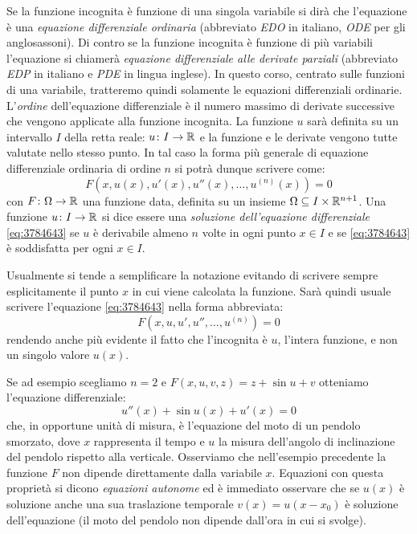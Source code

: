 Se la funzione incognita è funzione di una singola variabile si dirà che l'equazione è una
\emph{equazione differenziale ordinaria}
%
%
(abbreviato
\emph{EDO} %
in italiano,
\emph{ODE} %
per gli anglosassoni).
Di contro se la funzione incognita è funzione di più variabili l'equazione si chiamerà
\emph{equazione differenziale alle derivate parziali}
%
%
 (abbreviato \emph{EDP}  in italiano e \emph{PDE}
  in lingua inglese).
In questo corso, centrato sulle funzioni di una variabile, tratteremo quindi solamente le equazioni differenziali ordinarie.
L'\emph{ordine}
%
%
%
dell'equazione differenziale è il numero massimo di derivate successive che vengono applicate alla funzione incognita.
La funzione $u$ sarà definita su un intervallo $I$ della retta reale: $u\colon I \to {\mathbb R}$
e la funzione e le derivate vengono tutte valutate nello stesso punto. In tal caso
la forma più generale di equazione differenziale ordinaria di ordine $n$ si potrà dunque scrivere come:
\begin{equation}\label{eq:3784643}
  F(x,u(x),u'(x),u''(x), \dots, u^{(n)}(x)) = 0
\end{equation}
con $F\colon \Omega \to {\mathbb R}$ una funzione data, definita su un insieme $\Omega \subseteq I\times {\mathbb R}^{n+1}$.
Una funzione $u\colon I \to {\mathbb R}$ si dice essere una \emph{soluzione
dell'equazione differenziale} \eqref{eq:3784643} se $u$ è derivabile almeno
$n$ volte in ogni punto $x\in I$ e se \eqref{eq:3784643} è soddisfatta
per ogni $x\in I$.

Usualmente si tende a semplificare la notazione evitando di scrivere sempre
esplicitamente il punto $x$ in cui viene calcolata la funzione.
Sarà quindi usuale
scrivere l'equazione \eqref{eq:3784643}
nella forma abbreviata:
\[
  F(x,u,u',u'', \dots, u^{(n)}) = 0
\]
rendendo anche più evidente il fatto che l'incognita è $u$,
l'intera funzione, e non un singolo valore $u(x)$.


Se ad esempio scegliamo $n=2$ e $F(x,u,v,z)= z+\sin u + v$ otteniamo l'equazione differenziale:
\begin{equation}\label{eq:39872}
 u''(x) + \sin u(x) + u'(x) = 0
\end{equation}
che, in opportune unità di misura, è l'equazione del moto di un pendolo smorzato,
dove $x$ rappresenta il tempo e $u$ la misura dell'angolo di inclinazione del
pendolo rispetto alla verticale.
Osserviamo che nell'esempio precedente la funzione $F$ non dipende direttamente
dalla variabile $x$. Equazioni con questa proprietà si dicono
\emph{equazioni autonome}
ed è immediato osservare che se $u(x)$ è soluzione anche una sua traslazione
temporale $v(x) = u(x-x_0)$ è soluzione dell'equazione
(il moto del pendolo non dipende dall'ora in cui si svolge).

